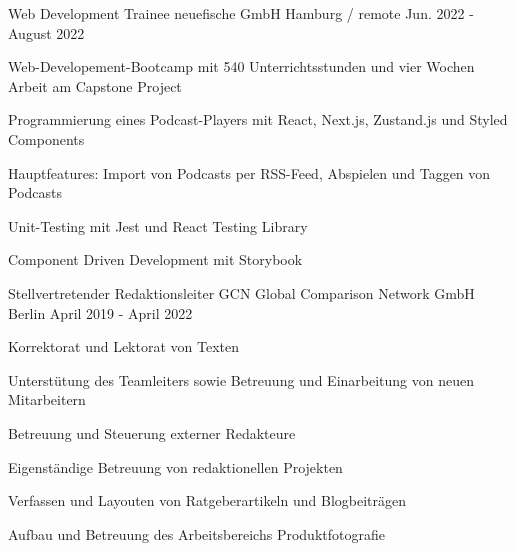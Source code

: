 

\begin{cventries}

  \cventry
    {Web Development Trainee} %
    {neuefische GmbH} %
    {Hamburg / remote} %
    {Jun. 2022 - August 2022} %
    {
      \begin{cvitems} %
        \item {Web-Developement-Bootcamp mit 540 Unterrichtsstunden und vier Wochen Arbeit am Capstone Project}
        \item {Programmierung eines Podcast-Players mit React, Next.js, Zustand.js und Styled Components}
        \item {Hauptfeatures: Import von Podcasts per RSS-Feed, Abspielen und Taggen von Podcasts}
        \item {Unit-Testing mit Jest und React Testing Library}
        \item {Component Driven Development mit Storybook}
      \end{cvitems}
    }

  \cventry
    {Stellvertretender Redaktionsleiter} %
    {GCN Global Comparison Network GmbH} %
    {Berlin} %
    {April 2019 - April 2022} %
    {
      \begin{cvitems} %
        \item {Korrektorat und Lektorat von Texten}
        \item {Unterstütung des Teamleiters sowie Betreuung und Einarbeitung von neuen Mitarbeitern}
        \item {Betreuung und Steuerung externer Redakteure}
        \item {Eigenständige Betreuung von redaktionellen Projekten}
        \item {Verfassen und Layouten von Ratgeberartikeln und Blogbeiträgen}
        \item {Aufbau und Betreuung des Arbeitsbereichs Produktfotografie}
      \end{cvitems}
    }


\end{cventries}
